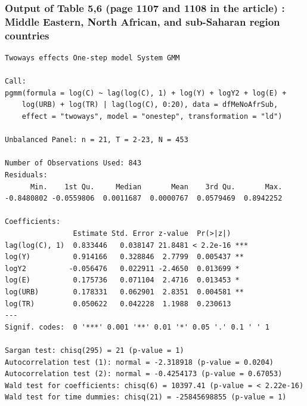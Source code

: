 \documentclass[
  11pt,
]{article}
\begin{document}
\hypertarget{output-of-table-56-page-1107-and-1108-in-the-article-middle-eastern-north-african-and-sub-saharan-region-countries}{%
\subsubsection{Output of Table 5,6 (page 1107 and 1108 in the article) :
Middle Eastern, North African, and sub-Saharan region
countries}\label{output-of-table-56-page-1107-and-1108-in-the-article-middle-eastern-north-african-and-sub-saharan-region-countries}}

\begin{verbatim}
Twoways effects One-step model System GMM 

Call:
pgmm(formula = log(C) ~ lag(log(C), 1) + log(Y) + logY2 + log(E) + 
    log(URB) + log(TR) | lag(log(C), 0:20), data = dfMeNoAfrSub, 
    effect = "twoways", model = "onestep", transformation = "ld")

Unbalanced Panel: n = 21, T = 2-23, N = 453

Number of Observations Used: 843
Residuals:
      Min.    1st Qu.     Median       Mean    3rd Qu.       Max. 
-0.8480802 -0.0559806  0.0011687  0.0000767  0.0579469  0.8942252 

Coefficients:
                Estimate Std. Error z-value  Pr(>|z|)    
lag(log(C), 1)  0.833446   0.038147 21.8481 < 2.2e-16 ***
log(Y)          0.914166   0.328846  2.7799  0.005437 ** 
logY2          -0.056476   0.022911 -2.4650  0.013699 *  
log(E)          0.175736   0.071104  2.4716  0.013453 *  
log(URB)        0.178331   0.062901  2.8351  0.004581 ** 
log(TR)         0.050622   0.042228  1.1988  0.230613    
---
Signif. codes:  0 '***' 0.001 '**' 0.01 '*' 0.05 '.' 0.1 ' ' 1

Sargan test: chisq(295) = 21 (p-value = 1)
Autocorrelation test (1): normal = -2.318918 (p-value = 0.0204)
Autocorrelation test (2): normal = -0.4254173 (p-value = 0.67053)
Wald test for coefficients: chisq(6) = 10397.41 (p-value = < 2.22e-16)
Wald test for time dummies: chisq(21) = -25845698855 (p-value = 1)
\end{verbatim}
\end{document}
